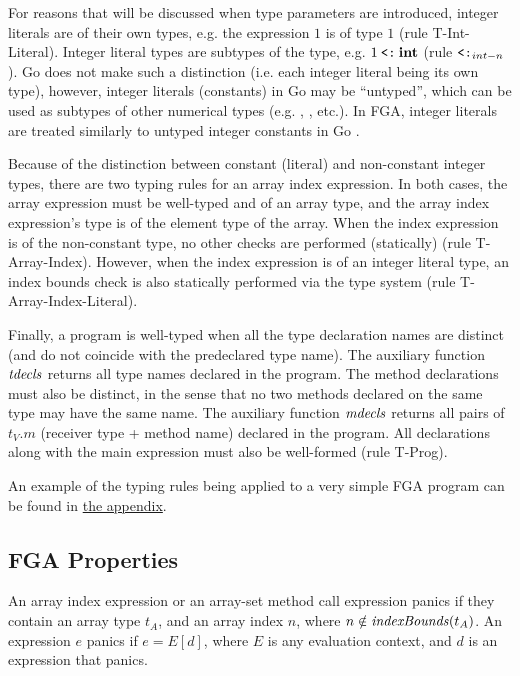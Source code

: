 For reasons that will be discussed when type parameters are introduced, integer
literals are of their own types, e.g. the expression $1$ is of type $1$ (rule
T-Int-Literal). Integer literal types are subtypes of the  type, e.g. $1
    \mathbin{\texttt{<:}} \texttt{\bf int}$ (rule $\mathbin{\texttt{<:}}_{int-n}$). Go does not make such a distinction (i.e.
each integer literal being its own type), however, integer literals (constants)
in Go may be ``untyped'', which can be used as subtypes of other numerical types
(e.g. , ,  etc.). In FGA, integer literals are
treated similarly to untyped integer constants in Go \autocite{spec}.

Because of the distinction between constant (literal) and non-constant integer
types, there are two typing rules for an array index expression. In both cases,
the array expression must be well-typed and of an array type, and the array
index expression's type is of the element type of the array. When the index
expression is of the non-constant  type, no other checks are performed
(statically) (rule T-Array-Index). However, when the index expression is of an
integer literal type, an index bounds check is also statically performed via the
type system (rule T-Array-Index-Literal).

Finally, a program is well-typed when all the type declaration names are
distinct (and do not coincide with the predeclared  type name). The
auxiliary function $\mathit{tdecls}$ returns all type names declared in the program. The
method declarations must also be distinct, in the sense that no two methods
declared on the same type may have the same name. The auxiliary function
$\mathit{mdecls}$ returns all pairs of $t_V.m$ (receiver type + method name) declared in
the program. All declarations along with the main expression must also be
well-formed (rule T-Prog).

An example of the typing rules being applied to a very simple FGA program can
be found in \hyperref[sec:fg-typing-derivation-example]{the appendix}.




\subsection{FGA Properties}

An array index expression or an array-set method call expression panics if they
contain an array type $t_A$, and an array index $n$, where $n \notin
    \mathit{indexBounds}(t_A)$. An expression $e$ panics if $e = E[d]$, where $E$ is any
evaluation context, and $d$ is an expression that panics.


